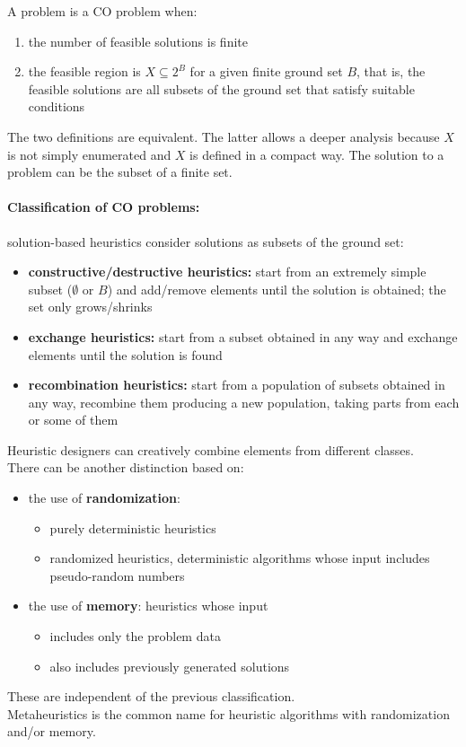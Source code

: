 \documentclass[11pt]{article}
\begin{document}
	A problem is a CO problem when: 
	\begin{enumerate}
		\item the number of feasible solutions is finite
		\item the feasible region is $X \subseteq 2^B$ for a given finite ground set $B$, that is, the feasible solutions are all subsets of the ground set that satisfy suitable conditions
	\end{enumerate}
	The two definitions are equivalent. The latter allows a deeper analysis because $X$ is not simply enumerated and $X$ is defined in a compact way. The solution to a problem can be the subset of a finite set. \\
	
	\newpage
	
	\paragraph{Classification of CO problems:} solution-based heuristics consider solutions as subsets of the ground set: 
	\begin{itemize}
		\item \textbf{constructive/destructive heuristics:} start from an extremely simple subset ($\emptyset$ or $B$) and add/remove elements until the solution is obtained; the set only grows/shrinks
		\item \textbf{exchange heuristics:} start from a subset obtained in any way and exchange elements until the solution is found
		\item \textbf{recombination heuristics:} start from a population of subsets obtained in any way, recombine them producing a new population, taking parts from each or some of them
	\end{itemize}
	Heuristic designers can creatively combine elements from different classes.\\
	
	There can be another distinction based on: 
	\begin{itemize}
		\item the use of \textbf{randomization}: 
		\begin{itemize}
			\item purely deterministic heuristics
			\item randomized heuristics, deterministic algorithms whose input includes pseudo-random numbers
		\end{itemize}
		\item the use of \textbf{memory}: heuristics whose input
		\begin{itemize}
			\item includes only the problem data 
			\item also includes previously generated solutions
		\end{itemize}
	\end{itemize}
	These are independent of the previous classification.\\
	Metaheuristics is the common name for heuristic algorithms with randomization and/or memory.\\
	
\end{document}
